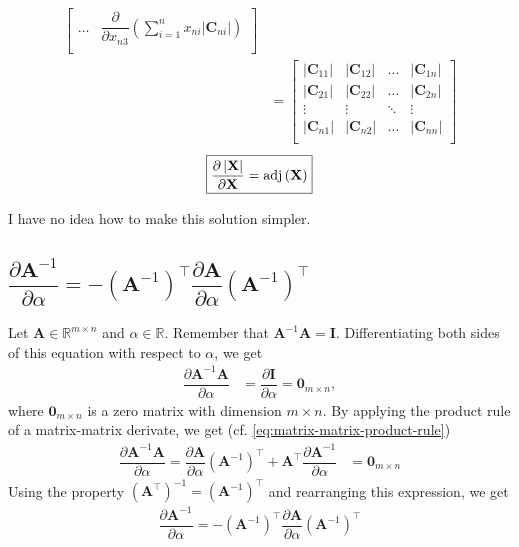 \documentclass{article}
\newcommand{\trans}{\top}
\newcommand{\adj}[1]{\ensuremath{\textnormal{adj}\left(#1\right)}} %
\newcommand\abs[1]{\left\lvert#1\right\rvert}
\begin{document}
\begin{align}
\begin{bmatrix}
        \dots & 
        \displaystyle \dfrac{\partial}{\partial x_{n3}} \left( \sum_{i = 1}^{n} x_{ni} \abs{\mathbf{C}_{ni}} \right) \\
    \end{bmatrix} \\
    &= \begin{bmatrix}
        \abs{\mathbf{C}_{11}} & \abs{\mathbf{C}_{12}} & \dots & \abs{\mathbf{C}_{1n}} \\
        \abs{\mathbf{C}_{21}} & \abs{\mathbf{C}_{22}} & \dots & \abs{\mathbf{C}_{2n}} \\
        \vdots & \vdots & \ddots & \vdots \\
        \abs{\mathbf{C}_{n1}} & \abs{\mathbf{C}_{n2}} & \dots & \abs{\mathbf{C}_{nn}} \\
    \end{bmatrix}
\end{align}
\begin{align}
    \boxed{\dfrac{\partial \abs{\mathbf{X}}}{\partial \mathbf{X}} = \adj{\mathbf{X}}}
\end{align}

I have no idea how to make this solution simpler.

\subsection{\(\dfrac{\partial \mathbf{A}^{-1}}{\partial \alpha} = - {\left( \mathbf{A}^{-1} \right)}^{\trans} \dfrac{\partial \mathbf{A}}{\partial \alpha} {\left( \mathbf{A}^{-1} \right)}^{\trans}\)}
Let \(\mathbf{A}\in \mathbb{R}^{m\times n}\) and \(\alpha \in \mathbb{R}\). Remember that \(\mathbf{A}^{-1}\mathbf{A} = \mathbf{I}\). Differentiating both sides of this equation with respect to \(\alpha\), we get
\begin{align}
    \dfrac{\partial \mathbf{A}^{-1}\mathbf{A}}{\partial \alpha} & = \dfrac{\partial \mathbf{I}}{\partial \alpha} = \mathbf{0}_{m \times n},
\end{align}
where \(\mathbf{0}_{m \times n}\) is a zero matrix with dimension \(m \times n\). By applying the product rule of a matrix-matrix derivate, we get (cf. \eqref{eq:matrix-matrix-product-rule})
\begin{align}
    \dfrac{\partial \mathbf{A}^{-1}\mathbf{A}}{\partial \alpha} =  \dfrac{\partial \mathbf{A}}{\partial \alpha} \left( \mathbf{A}^{-1} \right)^{\trans} + \mathbf{A}^{\trans} \dfrac{\partial \mathbf{A}^{-1}}{\partial \alpha} & = \mathbf{0}_{m \times n}
\end{align}
Using the property \(\left( \mathbf{A}^{\trans} \right)^{-1} = \left( \mathbf{A}^{-1} \right)^{\trans}\) and rearranging this expression, we get
\begin{align}
    \boxed{\dfrac{\partial \mathbf{A}^{-1}}{\partial \alpha} = - {\left( \mathbf{A}^{-1} \right)}^{\trans} \dfrac{\partial \mathbf{A}}{\partial \alpha} {\left( \mathbf{A}^{-1} \right)}^{\trans}}
\end{align}

\nocite{*}
\printbibliography
\end{document}

